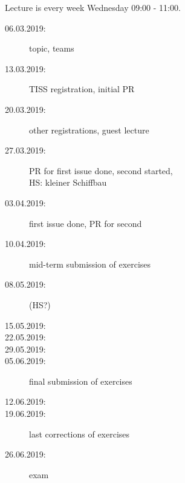 


\date{27.3.2018}



\renewcommand{\enquote}[1]{\emph{``#1''}} %

\begin{frame}
	\titlepage
	\doclicenseThis
\end{frame}

\begin{frame}
	Lecture is every week Wednesday 09:00 - 11:00.

	\begin{description}
		\item[06.03.2019:] {\color{gray}topic, teams}
		\item[13.03.2019:] {\color{gray}TISS registration, initial PR}
		\item[20.03.2019:] {\color{gray}other registrations, guest lecture}
		\item[27.03.2019:] {\color{red}PR for first issue done, second started, \\ HS: kleiner Schiffbau}
		\item[03.04.2019:] {\color{orange}first issue done, PR for second}
		\item[10.04.2019:] mid-term submission of exercises
		\item[08.05.2019:] (HS?)
		\item[15.05.2019:]
		\item[22.05.2019:]
		\item[29.05.2019:]
		\item[05.06.2019:] final submission of exercises
		\item[12.06.2019:]
		\item[19.06.2019:] last corrections of exercises
		\item[26.06.2019:] exam
	\end{description}
\end{frame}

